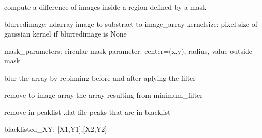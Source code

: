 \documentclass[letterpaper,10pt,english]{sphinxmanual}
\begin{document}

\begin{fulllineitems}
\label{\detokenize{PeakSearch:LaueTools.readmccd.filterimage}}
compute a difference of images inside a region defined by a mask

blurredimage:    ndarray image to substract to image\_array
kernelsize:    pixel size of gaussian kernel if blurredimage is None

mask\_parameters: circular mask parameter: center=(x,y), radius, value outside mask

\end{fulllineitems}


\begin{fulllineitems}
\label{\detokenize{PeakSearch:LaueTools.readmccd.blurCCD_with_binning}}
blur the array by rebinning before and after aplying the filter

\end{fulllineitems}


\begin{fulllineitems}
\label{\detokenize{PeakSearch:LaueTools.readmccd.remove_minimum_background}}
remove to image array the array resulting from minimum\_filter

\end{fulllineitems}


\begin{fulllineitems}
\label{\detokenize{PeakSearch:LaueTools.readmccd.purgePeaksListFile}}
remove in peaklist .dat file peaks that are in blacklist

blacklisted\_XY:         {[}X1,Y1{]},{[}X2,Y2{]}

\end{fulllineitems}
\end{document}
